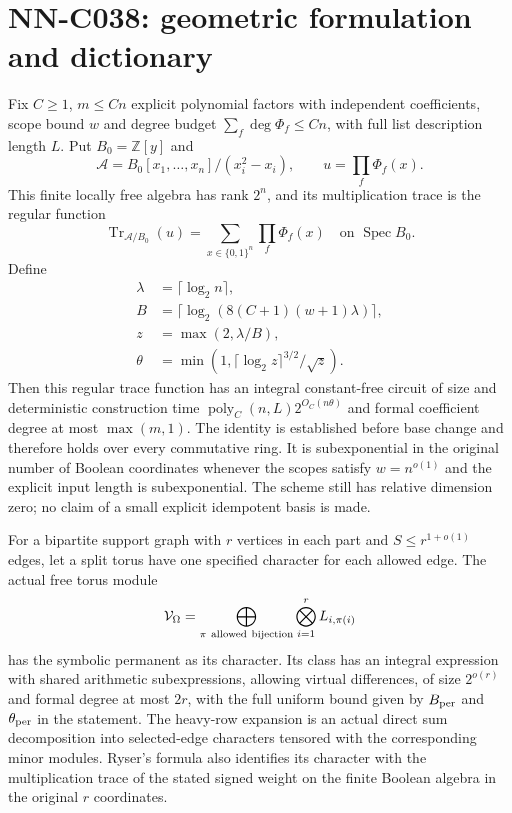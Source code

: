 \section{NN-C038: geometric formulation and dictionary}
\begin{geometricstatement}[NN-C038]
Fix $C\ge1$, $m\le Cn$ explicit polynomial factors with independent coefficients, scope bound $w$ and degree budget $\sum_f\deg\Phi_f\le Cn$, with full list description length $L$. Put $B_0=\mathbb Z[y]$ and
\[
 \mathscr A=B_0[x_1,\ldots,x_n]/(x_i^2-x_i),\qquad
                         u=\prod_f\Phi_f(x).
\]
This finite locally free algebra has rank $2^n$, and its multiplication trace is the regular function
\[
               \operatorname{Tr}_{\mathscr A/B_0}(u)
                 =\sum_{x\in\{0,1\}^n}\prod_f\Phi_f(x)
                                     \quad\text{on }\operatorname{Spec}B_0.
\]
Define
\[
 \begin{aligned}
 \lambda&=\lceil\log_2n\rceil,\\
 B&=\lceil\log_2(8(C+1)(w+1)\lambda)\rceil,\\
 z&=\max(2,\lambda/B),\\
 \theta&=\min(1,\lceil\log_2z\rceil^{3/2}/\sqrt z).
 \end{aligned}
\]
Then
this regular trace function has an integral constant-free circuit of size and deterministic construction time
$\operatorname{poly}_C(n,L)2^{O_C(n\theta)}$ and formal coefficient degree at most $\max(m,1)$. The identity is established before base change and therefore holds over every commutative ring. It is subexponential in the original number of Boolean coordinates whenever the scopes satisfy $w=n^{o(1)}$ and the explicit input length is subexponential. The scheme still has relative dimension zero; no claim of a small explicit idempotent basis is made.

For a bipartite support graph with $r$ vertices in each part and $S\le r^{1+o(1)}$ edges, let a split torus have one specified character for each allowed edge. The actual free torus module
\[
                   \mathcal V_\Omega
                    =\bigoplus_{\pi\ {\rm allowed\ bijection}}
                            \bigotimes_{i=1}^r L_{i,\pi(i)}
\]
has the symbolic permanent as its character. Its class has an integral expression with shared arithmetic subexpressions, allowing virtual differences, of size $2^{o(r)}$ and formal degree at most $2r$, with the full uniform bound given by $B_{\rm per}$ and $\theta_{\rm per}$ in the statement. The heavy-row expansion is an actual direct sum decomposition into selected-edge characters tensored with the corresponding minor modules. Ryser's formula also identifies its character with the multiplication trace of the stated signed weight on the finite Boolean algebra in the original $r$ coordinates.


\end{geometricstatement}
